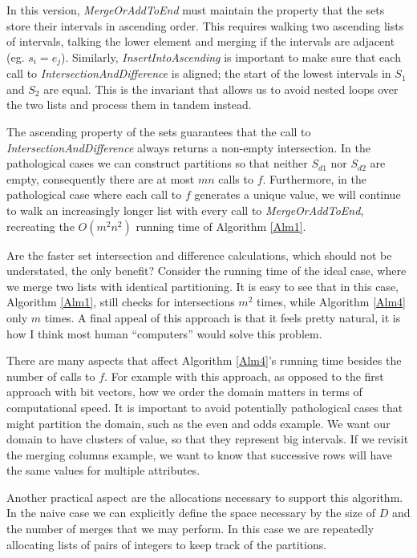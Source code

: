 \documentclass{article}
\begin{document}
In this version, \emph{MergeOrAddToEnd} must maintain the property that the
sets store their intervals in ascending order.
This requires walking two ascending lists of intervals,
talking the lower element and merging if the intervals are adjacent
(eg. $s_{i} = e_{j}$).
Similarly, \emph{InsertIntoAscending} is important to make sure that each
call to \emph{IntersectionAndDifference} is aligned;
the start of the lowest intervals in $S_{1}$ and $S_{2}$ are equal.
This is the invariant that allows us to avoid nested loops over the two lists
and process them in tandem instead.

The ascending property of the sets guarantees that the call to
\emph{IntersectionAndDifference} always returns a non-empty intersection.
In the pathological cases we can construct partitions so that
neither $S_{d1}$ nor $S_{d2}$ are empty,
consequently there are at most $mn$ calls to $f$.
Furthermore,
in the pathological case where each call to $f$ generates a unique value,
we will continue to walk an increasingly longer list with every call to
\emph{MergeOrAddToEnd},
recreating the $O(m^{2}n^{2})$ running time of Algorithm \ref{Alm1}.

Are the faster set intersection and difference calculations,
which should not be understated,
the only benefit?
Consider the running time of the ideal case,
where we merge two lists with identical partitioning.
It is easy to see that in this case,
Algorithm \ref{Alm1},
still checks for intersections $m^{2}$ times,
while Algorithm \ref{Alm4} only $m$ times.
A final appeal of this approach is that it feels pretty natural,
it is how I think most human ``computers'' would solve this problem.

There are many aspects that affect Algorithm \ref{Alm4}'s running time besides
the number of calls to $f$.
For example
with this approach,
as opposed to the first approach with bit vectors,
how we order the domain matters in terms of computational speed.
It is important to avoid potentially pathological cases that might
partition the domain, such as the even and odds example.
We want our domain to have clusters of value,
so that they represent big intervals.
If we revisit the merging columns example,
we want to know that successive rows will have the same values for
multiple attributes.

Another practical aspect are the allocations necessary to support this
algorithm.
In the naive case we can explicitly define the space necessary by the size
of $D$ and the number of merges that we may perform.
In this case we are repeatedly allocating lists of pairs of integers to keep
track of the partitions.
\end{document}

